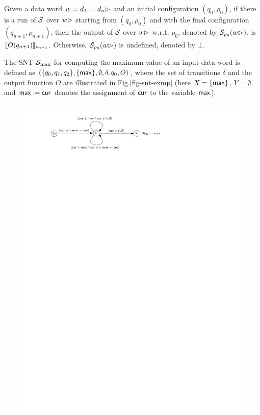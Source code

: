 
Given a data word $w = d_1 \dots d_n\rhd$ and an initial configuration $(q_0, \rho_0)$, if there is a run of ${\mathcal{S} }$ over $w\rhd$ starting from $(q_0,\rho_0)$ and with the final configuration $(q_{n+1},\rho_{n+1})$, then the output of ${\mathcal{S} }$ over $w\rhd$ w.r.t. $\rho_0$, denoted by ${{\mathcal{S} }}_{\rho_0}(w\rhd)$, is $\llbracket O(q_{n+1})\rrbracket_{\rho_{n+1}}$. Otherwise, ${{\mathcal{S} }}_{\rho_0}(w\rhd)$ is undefined, denoted by $\bot$. 


\begin{example}
The SNT ${\mathcal{S} }_{\max}$ for computing the maximum value of an input data word is defined as $(\{q_0,q_1,q_2\}, \{\mathsf{max}\}, \emptyset, \delta, q_0, O)$, where the set of transitions $\delta$ and the output function $O$ are illustrated in Fig.\ref{fig-snt-exmp}
%
(here $X=\{\mathsf{max}\}$, $Y=\emptyset$, and $\mathsf{max}:=\mathsf{cur}$ denotes the assignment of $\mathsf{cur}$ to the variable $\mathsf{max}$).
\begin{figure}[htbp]
\begin{center}
\includegraphics{snt-exmp.pdf}

\end{center}
\end{figure}
\end{example}
